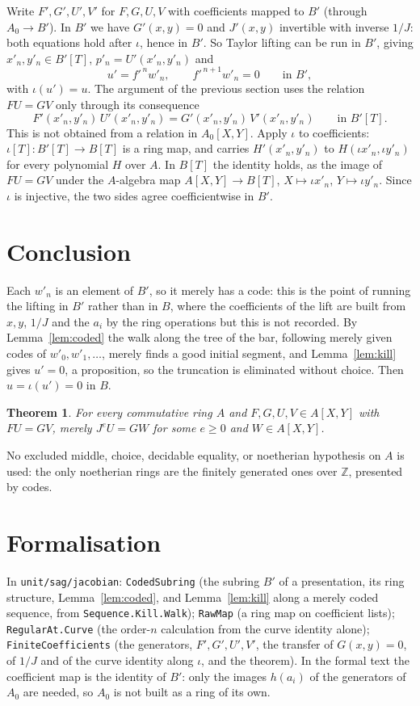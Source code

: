 \documentclass[11pt]{amsart}
\newtheorem{theorem}{Theorem}[section]
\theoremstyle{definition}
\theoremstyle{remark}
\newcommand{\code}[1]{\texttt{#1}}
\begin{document}
Write $F',G',U',V'$ for $F,G,U,V$ with coefficients mapped to $B'$
(through $A_0\to B'$). In $B'$ we have $G'(x,y)=0$ and $J'(x,y)$
invertible with inverse $1/J$: both equations hold after $\iota$, hence
in $B'$. So Taylor lifting can be run in $B'$, giving
$x'_n,y'_n\in B'[T]$, $p'_n=U'(x'_n,y'_n)$ and
\[
 u'=f'^{\,n}w'_n,\qquad f'^{\,n+1}w'_n=0\qquad\text{in }B',
\]
with $\iota(u')=u$. The argument of the previous section uses the
relation $FU=GV$ only through its consequence
\[
 F'(x'_n,y'_n)\,U'(x'_n,y'_n)=G'(x'_n,y'_n)\,V'(x'_n,y'_n)
 \qquad\text{in }B'[T].
\]
This is not obtained from a relation in $A_0[X,Y]$. Apply $\iota$ to
coefficients: $\iota[T]:B'[T]\to B[T]$ is a ring map, and carries
$H'(x'_n,y'_n)$ to $H(\iota x'_n,\iota y'_n)$ for every polynomial $H$
over $A$. In $B[T]$ the identity holds, as the image of $FU=GV$ under
the $A$-algebra map $A[X,Y]\to B[T]$, $X\mapsto\iota x'_n$,
$Y\mapsto\iota y'_n$. Since $\iota$ is injective, the two sides agree
coefficientwise in $B'$.

\section{Conclusion}

Each $w'_n$ is an element of $B'$, so it merely has a code: this is the
point of running the lifting in $B'$ rather than in $B$, where the
coefficients of the lift are built from $x,y$, $1/J$ and the $a_i$ by
the ring operations but this is not recorded. By Lemma~\ref{lem:coded}
the walk along the tree of the bar, following merely given codes of
$w'_0,w'_1,\ldots$, merely finds a good initial segment, and
Lemma~\ref{lem:kill} gives $u'=0$, a proposition, so the truncation is
eliminated without choice. Then $u=\iota(u')=0$ in $B$.

\begin{theorem}
For every commutative ring $A$ and $F,G,U,V\in A[X,Y]$ with $FU=GV$,
merely $J^eU=GW$ for some $e\geq0$ and $W\in A[X,Y]$.
\end{theorem}

No excluded middle, choice, decidable equality, or noetherian
hypothesis on $A$ is used: the only noetherian rings are the finitely
generated ones over $\mathbb Z$, presented by codes.

\section*{Formalisation}

In \code{unit/sag/jacobian}:
\code{CodedSubring} (the subring $B'$ of a presentation, its ring
structure, Lemma~\ref{lem:coded}, and Lemma~\ref{lem:kill} along a
merely coded sequence, from \code{Sequence.Kill.Walk});
\code{RawMap} (a ring map on coefficient lists);
\code{RegularAt.Curve} (the order-$n$ calculation from the curve
identity alone);
\code{FiniteCoefficients} (the generators, $F',G',U',V'$, the transfer
of $G(x,y)=0$, of $1/J$ and of the curve identity along $\iota$, and the
theorem). In the formal text the coefficient map is the identity of
$B'$: only the images $h(a_i)$ of the generators of $A_0$ are needed,
so $A_0$ is not built as a ring of its own.
\end{document}
